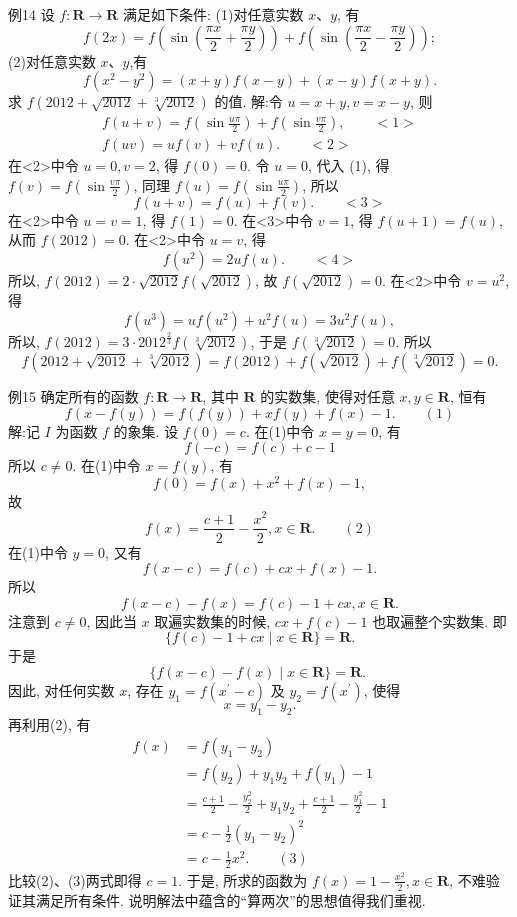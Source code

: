 例14 设 $f: \mathbf{R} \rightarrow \mathbf{R}$ 满足如下条件:
(1)对任意实数 $x 、 y$, 有
$$
f(2 x)=f\left(\sin \left(\frac{\pi x}{2}+\frac{\pi y}{2}\right)\right)+f\left(\sin \left(\frac{\pi x}{2}-\frac{\pi y}{2}\right)\right) ;
$$
(2)对任意实数 $x 、 y$,有
$$
f\left(x^2-y^2\right)=(x+y) f(x-y)+(x-y) f(x+y) .
$$
求 $f(2012+\sqrt{2012}+\sqrt[3]{2012})$ 的值.
解:令 $u=x+y, v=x-y$, 则
$$
\begin{gathered}
f(u+v)=f\left(\sin \frac{u \pi}{2}\right)+f\left(\sin \frac{v \pi}{2}\right), \quad\quad <1>\\
f(u v)=u f(v)+v f(u) . \quad\quad <2>
\end{gathered}
$$
在<2>中令 $u=0, v=2$, 得 $f(0)=0$.
令 $u=0$, 代入 (1), 得 $f(v)=f\left(\sin \frac{v \pi}{2}\right)$, 同理 $f(u)=f\left(\sin \frac{u \pi}{2}\right)$, 所以
$$
f(u+v)=f(u)+f(v) .  \quad\quad <3>
$$
在<2>中令 $u=v=1$, 得 $f(1)=0$.
在<3>中令 $v=1$, 得 $f(u+1)=f(u)$, 从而 $f(2012)=0$.
在<2>中令 $u=v$, 得
$$
f\left(u^2\right)=2 u f(u) .  \quad\quad <4>
$$
所以, $f(2012)=2 \cdot \sqrt{2012} f(\sqrt{2012})$, 故 $f(\sqrt{2012})=0$.
在<2>中令 $v=u^2$, 得
$$
f\left(u^3\right)=u f\left(u^2\right)+u^2 f(u)=3 u^2 f(u),
$$
所以, $f(2012)=3 \cdot 2012^{\frac{2}{3}} f(\sqrt[3]{2012})$, 于是 $f(\sqrt[3]{2012})=0$.
所以
$$
f(2012+\sqrt{2012}+\sqrt[3]{2012})=f(2012)+f(\sqrt{2012})+f(\sqrt[3]{2012})=0 .
$$



例15 确定所有的函数 $f: \mathbf{R} \rightarrow \mathbf{R}$, 其中 $\mathbf{R}$ 的实数集, 使得对任意 $x, y \in\mathbf{R}$, 恒有
$$
f(x-f(y))=f(f(y))+x f(y)+f(x)-1 .  \quad\quad (1)
$$
解:记 $I$ 为函数 $f$ 的象集.
设 $f(0)=c$.
在(1)中令 $x=y=0$, 有
$$
f(-c)=f(c)+c-1
$$
所以 $c \neq 0$.
在(1)中令 $x=f(y)$, 有
$$
f(0)=f(x)+x^2+f(x)-1,
$$
故
$$
f(x)=\frac{c+1}{2}-\frac{x^2}{2}, x \in \mathbf{R} . \quad\quad (2)
$$
在(1)中令 $y=0$, 又有
$$
f(x-c)=f(c)+c x+f(x)-1 .
$$
所以
$$
f(x-c)-f(x)=f(c)-1+c x, x \in \mathbf{R} .
$$
注意到 $c \neq 0$, 因此当 $x$ 取遍实数集的时候, $c x+f(c)-1$ 也取遍整个实数集.
即
$$
\{f(c)-1+c x \mid x \in \mathbf{R}\}=\mathbf{R} .
$$
于是
$$
\{f(x-c)-f(x) \mid x \in \mathbf{R}\}=\mathbf{R} \text {. }
$$
因此, 对任何实数 $x$, 存在 $y_1=f\left(x^{\prime}-c\right)$ 及 $y_2=f\left(x^{\prime}\right)$, 使得
$$
x=y_1-y_2 .
$$
再利用(2), 有
$$
\begin{aligned}
f(x) & =f\left(y_1-y_2\right) \\
& =f\left(y_2\right)+y_1 y_2+f\left(y_1\right)-1 \\
& =\frac{c+1}{2}-\frac{y_2^2}{2}+y_1 y_2+\frac{c+1}{2}-\frac{y_1^2}{2}-1 \\
& =c-\frac{1}{2}\left(y_1-y_2\right)^2 \\
& =c-\frac{1}{2} x^2 . \quad\quad  (3)
\end{aligned}
$$
比较(2)、(3)两式即得 $c=1$.
于是, 所求的函数为 $f(x)=1-\frac{x^2}{2}, x \in \mathbf{R}$, 不难验证其满足所有条件.
说明解法中蕴含的“算两次”的思想值得我们重视.



